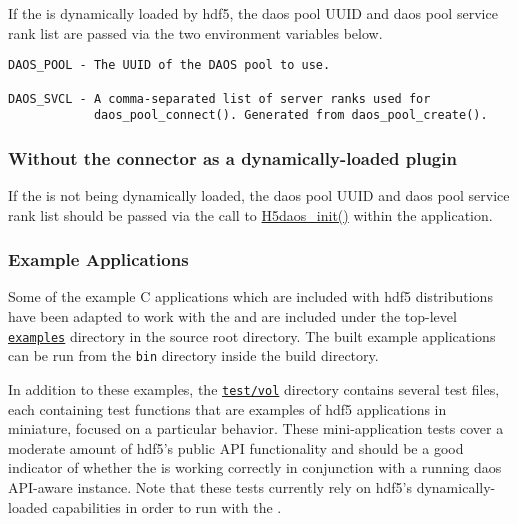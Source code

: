\documentclass[../users_guide.tex]{subfiles}
\begin{document}
If the \dvc{} is dynamically loaded by \acrshort{hdf5}, the \acrshort{daos} pool UUID and
\acrshort{daos} pool service rank list are passed via the two environment variables below.

\begin{verbatim}
DAOS_POOL - The UUID of the DAOS pool to use.

DAOS_SVCL - A comma-separated list of server ranks used for
            daos_pool_connect(). Generated from daos_pool_create().
\end{verbatim}

\subsubsection{Without the connector as a dynamically-loaded plugin}

If the \dvc{} is not being dynamically loaded, the \acrshort{daos} pool UUID
and \acrshort{daos} pool service rank list should be passed via the call to
\hyperref[ref:h5daos_init]{H5daos\_init()} within the application.

\subsubsection{Example Applications}

Some of the example C applications which are included with \acrshort{hdf5} distributions have been adapted to work with the \dvc{} and are included under the top-level \href{https://bitbucket.hdfgroup.org/projects/HDF5VOL/repos/daos-vol/browse/examples}{\texttt{examples}} directory in the \dvc{} source root directory. The built example applications can be run from the \texttt{bin} directory inside the build directory.

In addition to these examples, the \href{https://bitbucket.hdfgroup.org/projects/HDF5VOL/
repos/daos-vol/browse/test}{\texttt{test/vol}} directory contains several test
files, each containing test functions that are examples of \acrshort{hdf5} applications in
miniature, focused on a particular behavior. These mini-application tests cover a moderate 
amount of \acrshort{hdf5}'s public API functionality and should be a good indicator of
whether the \dvc{} is working correctly in conjunction with a
running \acrshort{daos} API-aware instance. Note that these tests currently rely on \acrshort{hdf5}'s
dynamically-loaded \vc{} capabilities in order to run with the \dvc{}.
\end{document}
